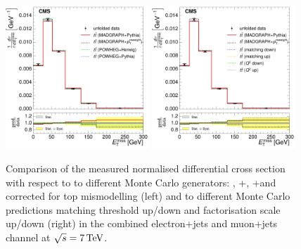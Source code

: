 \begin{figure}[hbtp]
    \centering
     \includegraphics[width=0.48\textwidth]{Chapters/04_Analysis/04b_XSections/images/results/7TeV/MET/central/normalised_xsection_combined_different_generators.pdf}\hfill
     \includegraphics[width=0.48\textwidth]{Chapters/04_Analysis/04b_XSections/images/results/7TeV/MET/central/normalised_xsection_combined_systematics_shifts.pdf}\hfill
     \caption{Comparison of the measured normalised differential cross section with respect to \met to
     different Monte Carlo generators: \MADGRAPH, \POWHEG+\HERWIG, \POWHEG+\PYTHIA and \MADGRAPH corrected for
     top \pt mismodelling (left) and to different Monte Carlo predictions matching threshold up/down and
     factorisation scale up/down (right) in the combined electron+jets and muon+jets channel at
     $\sqrt{s}=7\,\text{Te\hspace{-.08em}V}$.}
     \label{fig:result_MET_7TeV_combined}
\end{figure}

